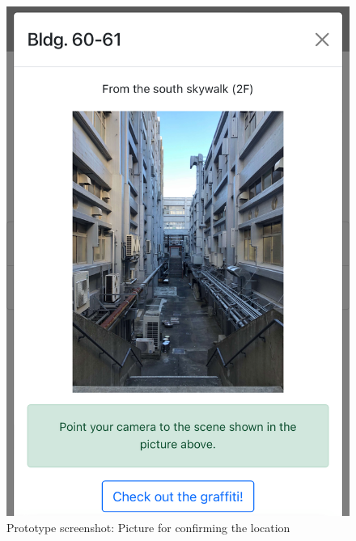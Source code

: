 \begin{figure}
\begin{minipage}{0.32\textwidth}
    \includegraphics[width=0.9\linewidth]{resources/4_methodology/prototype_loc_pic.png}
      \caption{Prototype screenshot: Picture for confirming the location}
  \end{minipage}\hfill
  \begin{minipage}{0.32\textwidth}
    \centering

\end{minipage}
\end{figure}
